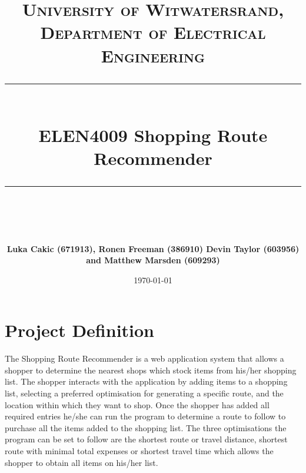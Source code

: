 \documentclass[10pt, a4paper, onecolumn]{scrartcl}
\newcommand{\horrule}[1]{\rule{\linewidth}{#1}}
\begin{document}
		\title{\normalfont \normalsize
			\textsc{University of Witwatersrand, Department of Electrical Engineering} \\ [10pt]
			\horrule{0.5pt} \\ [10pt]
			\huge ELEN4009 Shopping Route Recommender \\
			\horrule{2pt} \\ [10pt]}
		\author{\textbf{\normalsize{Luka Cakic (671913), Ronen Freeman (386910) Devin Taylor (603956) and Matthew Marsden (609293)}} \\ [10pt]}
		\date {\normalsize \today}
		
		\maketitle
		
%		
%		
%
%			
%	
		
	\section{Project Definition}
		
		The Shopping Route Recommender is a web application system that allows a shopper to determine the nearest shops which stock items from his/her shopping list. The shopper interacts with the application by adding items to a shopping list, selecting a preferred optimisation for generating a specific route, and the location within which they want to shop. Once the shopper has added all required entries he/she can run the program to determine a route to follow to purchase all the items added to the shopping list. The three optimisations the program can be set to follow are the shortest route or travel distance, shortest route with minimal total expenses or shortest travel time which allows the shopper to obtain all items on his/her list. 
				
\end{document}
